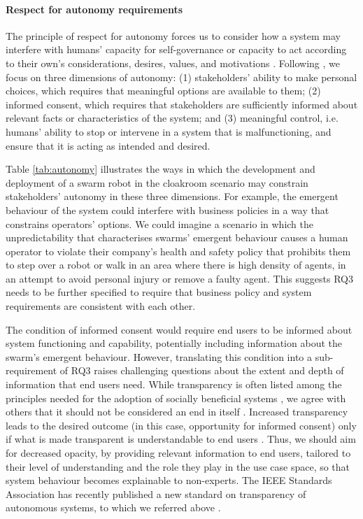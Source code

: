 \documentclass[lettersize,journal]{IEEEtran}
\begin{document}
\paragraph*{Respect for autonomy requirements}
The principle of respect for autonomy forces us to consider how a system may interfere with humans’ capacity for self-governance or capacity to act according to their own’s considerations, desires, values, and motivations \cite{beauchamp2019principles}. Following \cite{Porter2022}, we focus on three dimensions of autonomy: (1) stakeholders’ ability to make personal choices, which requires that meaningful options are available to them; (2) informed consent, which requires that stakeholders are sufficiently informed about relevant facts or characteristics of the system; and (3) meaningful control, i.e. humans’ ability to stop or intervene in a system that is malfunctioning, and ensure that it is acting as intended and desired.

Table \ref{tab:autonomy} illustrates the ways in which the development and deployment of a swarm robot in the cloakroom scenario may constrain stakeholders’ autonomy in these three dimensions. For example, the emergent behaviour of the system could interfere with business policies in a way that constrains operators’ options. We could imagine a scenario in which the unpredictability that characterises swarms’ emergent behaviour causes a human operator to violate their company’s health and safety policy that prohibits them to step over a robot or walk in an area where there is high density of agents, in an attempt to avoid personal injury or remove a faulty agent. This suggests RQ3 needs to be further specified to require that business policy and system requirements are consistent with each other.

The condition of informed consent would require end users to be informed about system functioning and capability, potentially including information about the swarm’s emergent behaviour. However, translating this condition into a sub-requirement of RQ3 raises challenging questions about the extent and depth of information that end users need. While transparency is often listed among the principles needed for the adoption of socially beneficial systems \cite{IEEEAligned}, we agree with others that it should not be considered an end in itself \cite{Porter2022}. Increased transparency leads to the desired outcome (in this case, opportunity for informed consent) only if what is made transparent is understandable to end users \cite{ananny2018seeing}. Thus, we should aim for decreased opacity, by providing relevant information to end users, tailored to their level of understanding and the role they play in the use case space, so that system behaviour becomes explainable to non-experts. The IEEE Standards Association has recently published a new standard on transparency of autonomous systems, to which we referred above \cite{IEEETransparency}.
\end{document}

